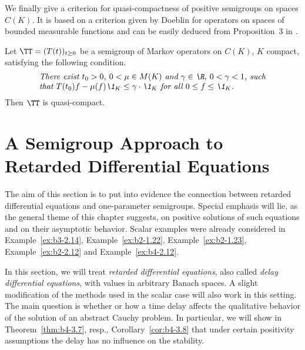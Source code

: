 We finally give a criterion for quasi-compactness of positive semigroups on spaces $C(K)$. 
It is based on a criterion given by Doeblin for operators on spaces of bounded measurable functions and can be easily deduced from  Proposition~3 in \textcite{lotz:1981}.
\begin{proposition}\label{prop:b4-2.13}
%
%
	Let $\TT = (T(t))_{t \geq 0}$ be a semigroup of Markov operators on $C(K)$, $K$ compact, satisfying the following condition.
\begin{equation*}\label{eq:b4-2.12}	
\begin{minipage}{.8\textwidth}
%	
\textit{There exist $t_{0} > 0$, $ 0 < \mu \in M(K)$ and  $\gamma \in \R$, $0 < \gamma < 1 $, 
such that  $T(t_{0})f - \mu(f)\1_K \leq \gamma \cdot \1_K$  for all   $0 \leq f \leq \1_K$.}
%
\end{minipage}
\end{equation*}
Then $\TT$ is quasi-compact.
\end{proposition}
\section{A Semigroup Approach to Retarded Differential Equations}\label{sec:b4-3}
\hspace{1cm}{\Large by Annette Grabosch und Ulrich Moustakas}
\vspace{.5cm}
\newline
The aim of this section is to put into evidence the connection between retarded differential equations and one-parameter semigroups.
Special emphasis will lie, as the general theme of this chapter suggests, on positive solutions of such equations and on their asymptotic behavior.
Scalar examples were already considered in Example~\ref{ex:b3-2.14}, Example~\ref{ex:b2-1.22}, Example~\ref{ex:b2-1.23}, Example~\ref{ex:b2-2.12} and Example~\ref{ex:b4-2.12}.

In this section, we will treat \emph{retarded differential equations}, also called \emph{delay differential equations}, with values in arbitrary Banach spaces.
A slight modification of the methods used in the scalar case will also work in this setting.
The main question is whether or how a time delay affects the qualitative behavior of the solution of an abstract Cauchy problem.
In particular, we will show in Theorem~\ref{thm:b4-3.7}, resp., Corollary~\ref{cor:b4-3.8} that under certain positivity assumptions the delay has no influence on the stability.


